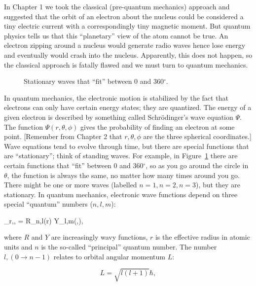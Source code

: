In Chapter 1 we took the classical (pre-quantum mechanics) approach and suggested that the orbit of an electron about the nucleus could be considered a tiny electric current with a correspondingly tiny magnetic moment.  
But quantum physics
tells us that this ``planetary'' view of the atom  cannot be true.  An electron zipping around a nucleus would generate radio waves hence lose energy and  eventually would  crash into the nucleus.   Apparently, this  does not happen, so the classical approach is fatally flawed and we must turn to quantum mechanics.   

\begin{figure}[h!tb]
\epsfxsize 13cm
\centering {}
\caption{Stationary waves that ``fit'' between 0 and 360$^{\circ}$.}
\label{fig:waves}
\end{figure}

In quantum mechanics,  the electronic motion is stabilized  by the fact that electrons can only have certain energy states; they are quantized.   The energy of a given electron is described by something called  
Schr\"odinger's 
wave equation $\Psi$. The function $\Psi(r,\theta,\phi)$ gives the probability  of finding an electron at some point.   [Remember from Chapter  2 that $r,\theta,\phi$ are the three spherical coordinates.]    Wave equations tend to evolve through time, but there are special functions that are ``stationary'';  think of standing waves.        For example, in Figure~\ref{fig:waves} there are certain functions that ``fit'' between 0 and 360$^{\circ}$, so as you go around the circle in $\theta$, the function is always the same, no matter how many times around you go.  There might be one or more waves (labelled $n=1, n=2, n=3$), but they are stationary.   In quantum mechanics, electronic wave functions depend on three special
 ``quantum'' numbers ($n,l,m$):

\beq
\Psi_{r,\theta,\phi} = R_{n,l}(r) Y_{l,m}(\phi,\theta),
\label{eq:wave}
\eeq

\noindent where $R$ and $Y$ are increasingly wavy functions, $r$ is the effective radius in atomic units and $n$ is the so-called ``principal'' quantum number. The number $l, (0 \rightarrow n-1)$ relates to orbital angular momentum $L$:

$$
L=\sqrt{l(l+1)}\hbar,
$$

